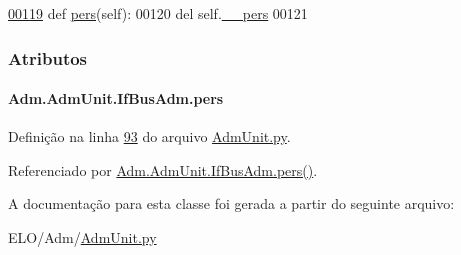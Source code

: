\begin{DoxyCode}
\hypertarget{classAdm_1_1AdmUnit_1_1IfBusAdm_l00119}{}\hyperlink{classAdm_1_1AdmUnit_1_1IfBusAdm_a58f07186cfb366e305adbbd4f7fd2b72}{00119}     \textcolor{keyword}{def }\hyperlink{classAdm_1_1AdmUnit_1_1IfBusAdm_a95ea8f39fbbcddf44822e1614c712bfe}{pers}(self):
00120         del self.\hyperlink{classAdm_1_1AdmUnit_1_1IfBusAdm_a52e9179e1047122bc667c1afa377c82c}{\_\_pers}
00121 
\end{DoxyCode}


\subsubsection{Atributos}
\hypertarget{classAdm_1_1AdmUnit_1_1IfBusAdm_a95ea8f39fbbcddf44822e1614c712bfe}{}
\paragraph[{pers}]{\setlength{\rightskip}{0pt plus 5cm}Adm.\+Adm\+Unit.\+If\+Bus\+Adm.\+pers}\label{classAdm_1_1AdmUnit_1_1IfBusAdm_a95ea8f39fbbcddf44822e1614c712bfe}


Definição na linha \hyperlink{AdmUnit_8py_source_l00093}{93} do arquivo \hyperlink{AdmUnit_8py_source}{Adm\+Unit.\+py}.



Referenciado por \hyperlink{classAdm_1_1AdmUnit_1_1IfBusAdm_a58f07186cfb366e305adbbd4f7fd2b72}{Adm.\+Adm\+Unit.\+If\+Bus\+Adm.\+pers()}.



A documentação para esta classe foi gerada a partir do seguinte arquivo\+:\begin{DoxyCompactItemize}
\item 
E\+L\+O/\+Adm/\hyperlink{AdmUnit_8py}{Adm\+Unit.\+py}\end{DoxyCompactItemize}
